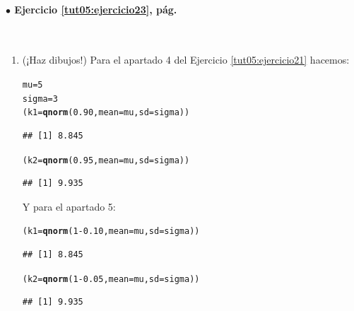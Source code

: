\documentclass[10pt,a4paper]{article}\usepackage[]{graphicx}\usepackage[]{color}
\makeatletter
\newcommand{\hlnum}[1]{\textcolor[rgb]{0.686,0.059,0.569}{#1}}%
\newcommand{\hlopt}[1]{\textcolor[rgb]{0,0,0}{#1}}%
\newcommand{\hlstd}[1]{\textcolor[rgb]{0.345,0.345,0.345}{#1}}%
\newcommand{\hlkwb}[1]{\textcolor[rgb]{0.69,0.353,0.396}{#1}}%
\newcommand{\hlkwc}[1]{\textcolor[rgb]{0.333,0.667,0.333}{#1}}%
\newcommand{\hlkwd}[1]{\textcolor[rgb]{0.737,0.353,0.396}{\textbf{#1}}}%
\newenvironment{kframe}{%
 \def\at@end@of@kframe{}%
 \ifinner\ifhmode%
  \def\at@end@of@kframe{\end{minipage}}%
  \begin{minipage}{\columnwidth}%
 \fi\fi%
 \def\FrameCommand##1{\hskip\@totalleftmargin \hskip-\fboxsep
 \colorbox{shadecolor}{##1}\hskip-\fboxsep
     \hskip-\linewidth \hskip-\@totalleftmargin \hskip\columnwidth}%
 \MakeFramed {\advance\hsize-\width
   \@totalleftmargin\z@ \linewidth\hsize
   \@setminipage}}%
 {\par\unskip\endMakeFramed%
 \at@end@of@kframe}
\newenvironment{knitrout}{}{} %
\makeatother
\begin{document}
\paragraph{\bf $\bullet$ Ejercicio \ref{tut05:ejercicio23}, pág. \pageref{tut05:ejercicio23}}
\label{tut05:ejercicio23:sol}\quad\\
\begin{enumerate}
  \item (¡Haz dibujos!) Para el apartado 4 del Ejercicio \ref{tut05:ejercicio21} hacemos:
\begin{knitrout}
\color{fgcolor}\begin{kframe}
\begin{alltt}
    \hlstd{mu} \hlkwb{=} \hlnum{5}
    \hlstd{sigma} \hlkwb{=} \hlnum{3}
    \hlstd{(k1} \hlkwb{=} \hlkwd{qnorm}\hlstd{(}\hlnum{0.90}\hlstd{,} \hlkwc{mean}\hlstd{=mu,} \hlkwc{sd}\hlstd{=sigma))}
\end{alltt}
\begin{verbatim}
## [1] 8.845
\end{verbatim}
\begin{alltt}
    \hlstd{(k2} \hlkwb{=} \hlkwd{qnorm}\hlstd{(}\hlnum{0.95}\hlstd{,} \hlkwc{mean}\hlstd{=mu,} \hlkwc{sd}\hlstd{=sigma))}
\end{alltt}
\begin{verbatim}
## [1] 9.935
\end{verbatim}
\end{kframe}
\end{knitrout}
    Y para el apartado 5:
\begin{knitrout}
\color{fgcolor}\begin{kframe}
\begin{alltt}
    \hlstd{(k1} \hlkwb{=} \hlkwd{qnorm}\hlstd{(}\hlnum{1} \hlopt{-} \hlnum{0.10}\hlstd{,} \hlkwc{mean}\hlstd{=mu,} \hlkwc{sd}\hlstd{=sigma))}
\end{alltt}
\begin{verbatim}
## [1] 8.845
\end{verbatim}
\begin{alltt}
    \hlstd{(k2} \hlkwb{=} \hlkwd{qnorm}\hlstd{(}\hlnum{1} \hlopt{-} \hlnum{0.05}\hlstd{,} \hlkwc{mean}\hlstd{=mu,} \hlkwc{sd}\hlstd{=sigma))}
\end{alltt}
\begin{verbatim}
## [1] 9.935
\end{verbatim}
\end{kframe}
\end{knitrout}

\end{enumerate}
\end{document}
